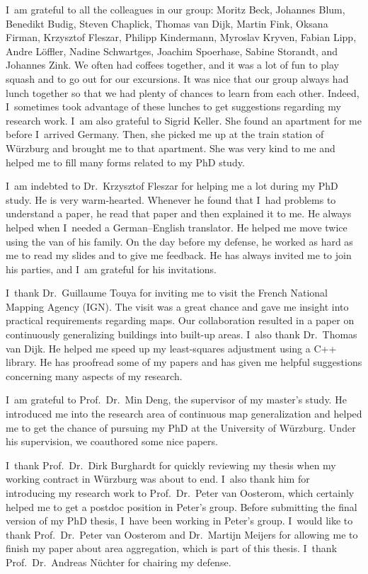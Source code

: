 {I~am grateful to all the colleagues in our group:
Moritz Beck, Johannes Blum, Benedikt Budig, 
Steven Chaplick, Thomas van Dijk, 
Martin Fink, Oksana Firman, Krzysztof Fleszar, 
Philipp Kindermann, Myroslav Kryven, 
Fabian Lipp, Andre L\"offler, 
Nadine Schwartges, Joachim Spoerhase, Sabine Storandt, 
and Johannes Zink.
%
We often had coffees together,
and it was a lot of fun to play squash and to go out for our excursions.
It was nice that our group always had lunch together
so that we had plenty of chances to learn from each other.
Indeed, I~sometimes took advantage of these lunches
to get suggestions regarding my research work.
%
I~am also grateful to Sigrid Keller.
She found an apartment for me 
before I~arrived Germany.
Then, she picked me up at the train station of W\"urzburg
and brought me to that apartment.
She was very kind to me 
and helped me to fill many forms related to my PhD study.

I~am indebted to Dr.\ Krzysztof Fleszar for 
helping me a lot during my PhD study.
He is very warm-hearted.
Whenever he found that I~had problems to understand a paper,
he read that paper and then explained it to me.
He always helped when I~needed a German--English translator.
He helped me move twice using the van of his family.
On the day before my defense, he worked as hard as me
to read my slides and to give me feedback.
He has always invited me to join his parties, 
and I~am grateful for his invitations.

I~thank Dr.\ Guillaume Touya for inviting me to visit
the French National Mapping Agency (IGN).
The visit was a great chance and gave me insight into
practical requirements regarding maps.
Our collaboration resulted in a paper on continuously
generalizing buildings into built-up areas.
%
I~also thank Dr.\ Thomas van Dijk.
He helped me speed up my 
least-squares adjustment using a C++ library.
He has proofread some of my papers
and has given me helpful suggestions 
concerning many aspects of my research.

I~am grateful to Prof.\ Dr.\ Min Deng,
the supervisor of my master's study.
He introduced me into the research area of 
continuous map generalization 
and helped me to get the chance of
pursuing my PhD at the University of W\"urzburg.
Under his supervision,
we coauthored some nice papers.

I~thank Prof.\ Dr.\ Dirk Burghardt 
for quickly reviewing my thesis
when my working contract in W\"urzburg was about to end.
I~also thank him for introducing my research work to
Prof.\ Dr.\ Peter van Oosterom, 
which certainly helped me to get a postdoc position
in Peter's group.
Before submitting the final version of my PhD thesis,
I~have been working in Peter's group.
I~would like to thank 
Prof.\ Dr.\ Peter van Oosterom and Dr.\ Martijn Meijers 
for allowing me to finish my paper about area aggregation,
which is part of this thesis. 
I~thank Prof.\ Dr.\ Andreas N\"uchter for chairing my defense.

}
